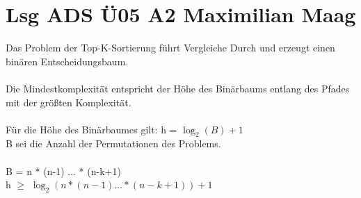 \documentclass{article}
\begin{document}
	\section*{Lsg ADS Ü05 A2 Maximilian Maag}
	Das Problem der Top-K-Sortierung führt Vergleiche Durch und erzeugt einen binären Entscheidungsbaum. \\ \\
	Die Mindestkomplexität entspricht der Höhe des Binärbaums entlang des Pfades mit der größten Komplexität. \\
	\\
	Für die Höhe des Binärbaumes gilt: h =  $\log_{2}(B) +1$ \\
	B sei die Anzahl der Permutationen des Problems. \\ \\
	B = n * (n-1) ... * (n-k+1) \\
	h $\geq$ $\log_{2}(n * (n-1) ... * (n-k+1)) +1$ \\
\end{document}
